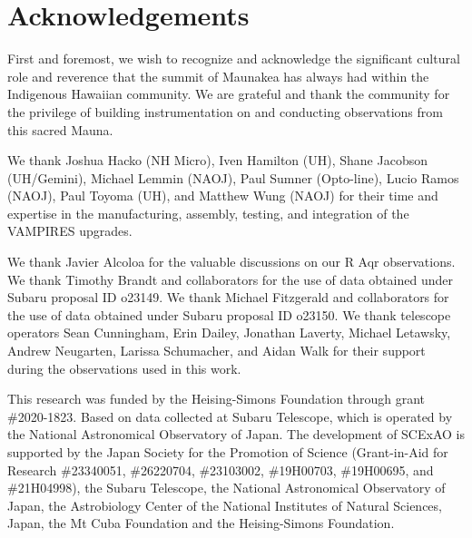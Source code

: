 \section*{Acknowledgements}
First and foremost, we wish to recognize and acknowledge the significant cultural role and reverence that the summit of Maunakea has always had within the Indigenous Hawaiian community. We are grateful and thank the community for the privilege of building instrumentation on and conducting observations from this sacred Mauna.

We thank Joshua Hacko (NH Micro), Iven Hamilton (UH), Shane Jacobson (UH/Gemini), Michael Lemmin (NAOJ), Paul Sumner (Opto-line), Lucio Ramos (NAOJ), Paul Toyoma (UH), and Matthew Wung (NAOJ) for their time and expertise in the manufacturing, assembly, testing, and integration of the VAMPIRES upgrades.

We thank Javier Alcoloa for the valuable discussions on our R Aqr observations. We thank Timothy Brandt and collaborators for the use of data obtained under Subaru proposal ID o23149. We thank Michael Fitzgerald and collaborators for the use of data obtained under Subaru proposal ID o23150. We thank telescope operators Sean Cunningham, Erin Dailey, Jonathan Laverty, Michael Letawsky, Andrew Neugarten, Larissa Schumacher, and Aidan Walk for their support during the observations used in this work.

This research was funded by the Heising-Simons Foundation through grant \#2020-1823. Based on data collected at Subaru Telescope, which is operated by the National Astronomical Observatory of Japan. The development of SCExAO is supported by the Japan Society for the Promotion of Science (Grant-in-Aid for Research \#23340051, \#26220704, \#23103002, \#19H00703, \#19H00695, and \#21H04998), the Subaru Telescope, the National Astronomical Observatory of Japan, the Astrobiology Center of the National Institutes of Natural Sciences, Japan, the Mt Cuba Foundation and the Heising-Simons Foundation.
